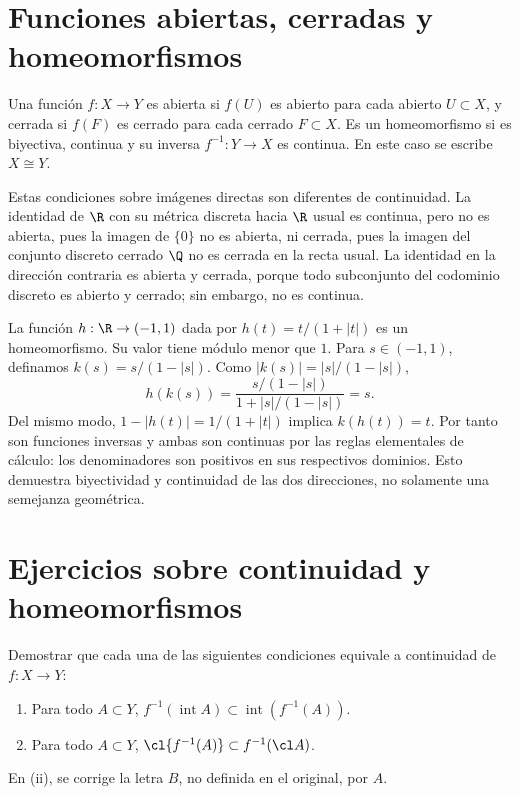 \section{Funciones abiertas, cerradas y homeomorfismos}
\begin{definicion}
Una función $f:X\to Y$ es abierta si $f(U)$ es abierto para cada abierto $U\subset X$, y cerrada si $f(F)$ es cerrado para cada cerrado $F\subset X$. Es un homeomorfismo si es biyectiva, continua y su inversa $f^{-1}:Y\to X$ es continua. En este caso se escribe $X\cong Y$.
\end{definicion}
Estas condiciones sobre imágenes directas son diferentes de continuidad. La identidad de $\R$ con su métrica discreta hacia $\R$ usual es continua, pero no es abierta, pues la imagen de $\{0\}$ no es abierta, ni cerrada, pues la imagen del conjunto discreto cerrado $\Q$ no es cerrada en la recta usual. La identidad en la dirección contraria es abierta y cerrada, porque todo subconjunto del codominio discreto es abierto y cerrado; sin embargo, no es continua.

\begin{ejemplo}\label{ch05:homeorecta}
La función $h:\R\to(-1,1)$ dada por $h(t)=t/(1+|t|)$ es un homeomorfismo. Su valor tiene módulo menor que $1$. Para $s\in(-1,1)$, definamos $k(s)=s/(1-|s|)$. Como $|k(s)|=|s|/(1-|s|)$,
\[
h(k(s))=\frac{s/(1-|s|)}{1+|s|/(1-|s|)}=s.
\]
Del mismo modo, $1-|h(t)|=1/(1+|t|)$ implica $k(h(t))=t$. Por tanto son funciones inversas y ambas son continuas por las reglas elementales de cálculo: los denominadores son positivos en sus respectivos dominios. Esto demuestra biyectividad y continuidad de las dos direcciones, no solamente una semejanza geométrica.
\end{ejemplo}

\section{Ejercicios sobre continuidad y homeomorfismos}
\begin{ejercicio}\label{ej:lectura-5-1}
Demostrar que cada una de las siguientes condiciones equivale a continuidad de $f:X\to Y$:
\begin{enumerate}[label=(\roman*)]
\item Para todo $A\subset Y$, $f^{-1}(\operatorname{int}A)\subset\operatorname{int}(f^{-1}(A))$.
\item Para todo $A\subset Y$, $\cl{f^{-1}(A)}\subset f^{-1}(\cl A)$.
\end{enumerate}
En (ii), se corrige la letra $B$, no definida en el original, por $A$.
\end{ejercicio}



